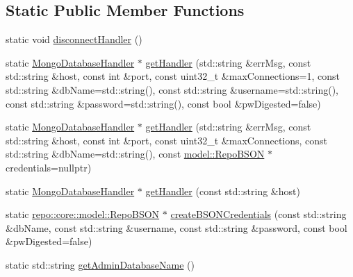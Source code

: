 \subsection*{Static Public Member Functions}
\begin{DoxyCompactItemize}
\item 
static void \hyperlink{classrepo_1_1core_1_1handler_1_1_mongo_database_handler_adad19607d035f2cd335f8fa2b7afa94f}{disconnect\+Handler} ()
\item 
static \hyperlink{classrepo_1_1core_1_1handler_1_1_mongo_database_handler}{Mongo\+Database\+Handler} $\ast$ \hyperlink{classrepo_1_1core_1_1handler_1_1_mongo_database_handler_a3efffd91168321728dcb28fc80eabd0a}{get\+Handler} (std\+::string \&err\+Msg, const std\+::string \&host, const int \&port, const uint32\+\_\+t \&max\+Connections=1, const std\+::string \&db\+Name=std\+::string(), const std\+::string \&username=std\+::string(), const std\+::string \&password=std\+::string(), const bool \&pw\+Digested=false)
\item 
static \hyperlink{classrepo_1_1core_1_1handler_1_1_mongo_database_handler}{Mongo\+Database\+Handler} $\ast$ \hyperlink{classrepo_1_1core_1_1handler_1_1_mongo_database_handler_a0432cb604d05dba64424f71bf4df6d39}{get\+Handler} (std\+::string \&err\+Msg, const std\+::string \&host, const int \&port, const uint32\+\_\+t \&max\+Connections, const std\+::string \&db\+Name=std\+::string(), const \hyperlink{classrepo_1_1core_1_1model_1_1_repo_b_s_o_n}{model\+::\+Repo\+B\+S\+O\+N} $\ast$credentials=nullptr)
\item 
static \hyperlink{classrepo_1_1core_1_1handler_1_1_mongo_database_handler}{Mongo\+Database\+Handler} $\ast$ \hyperlink{classrepo_1_1core_1_1handler_1_1_mongo_database_handler_ac7eda2da76c1fbe02bf523e207cf9d4d}{get\+Handler} (const std\+::string \&host)
\item 
static \hyperlink{classrepo_1_1core_1_1model_1_1_repo_b_s_o_n}{repo\+::core\+::model\+::\+Repo\+B\+S\+O\+N} $\ast$ \hyperlink{classrepo_1_1core_1_1handler_1_1_mongo_database_handler_a5605412c0f2586385dec3d279ba7591d}{create\+B\+S\+O\+N\+Credentials} (const std\+::string \&db\+Name, const std\+::string \&username, const std\+::string \&password, const bool \&pw\+Digested=false)
\item 
static std\+::string \hyperlink{classrepo_1_1core_1_1handler_1_1_mongo_database_handler_ae0e35b94deb711a346459ec88a57199c}{get\+Admin\+Database\+Name} ()
\end{DoxyCompactItemize}
